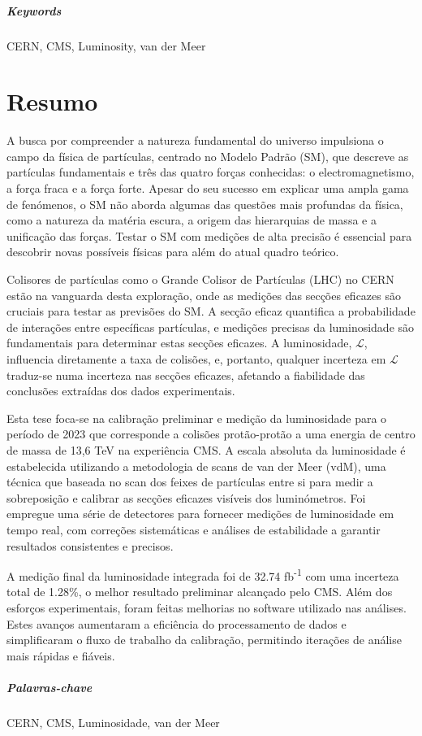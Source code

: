 \paragraph{Keywords} CERN, CMS, Luminosity, van der Meer

\cleardoublepage

\chapter*{Resumo}

A busca por compreender a natureza fundamental do universo impulsiona o campo da física de partículas, centrado no Modelo Padrão (SM), que descreve as partículas fundamentais e três das quatro forças conhecidas: o electromagnetismo, a força fraca e a força forte. Apesar do seu sucesso em explicar uma ampla gama de fenómenos, o SM não aborda algumas das questões mais profundas da física, como a natureza da matéria escura, a origem das hierarquias de massa e a unificação das forças. Testar o SM com medições de alta precisão é essencial para descobrir novas possíveis físicas para além do atual quadro teórico.

Colisores de partículas como o Grande Colisor de Partículas (LHC) no CERN estão na vanguarda desta exploração, onde as medições das secções eficazes são cruciais para testar as previsões do SM. A secção eficaz quantifica a probabilidade de interações entre específicas partículas, e medições precisas da luminosidade são fundamentais para determinar estas secções eficazes. A luminosidade, \(\mathcal{L}\), influencia diretamente a taxa de colisões, e, portanto, qualquer incerteza em \(\mathcal{L}\) traduz-se numa incerteza nas secções eficazes, afetando a fiabilidade das conclusões extraídas dos dados experimentais.

Esta tese foca-se na calibração preliminar e medição da luminosidade para o período de 2023 que corresponde a colisões protão-protão a uma energia de centro de massa de 13,6 TeV na experiência CMS. A escala absoluta da luminosidade é estabelecida utilizando a metodologia de scans de van der Meer (vdM), uma técnica que baseada no scan dos feixes de partículas entre si para medir a sobreposição e calibrar as secções eficazes visíveis dos luminómetros. Foi empregue uma série de detectores para fornecer medições de luminosidade em tempo real, com correções sistemáticas e análises de estabilidade a garantir resultados consistentes e precisos.

A medição final da luminosidade integrada foi de 32.74 fb\textsuperscript{-1} com uma incerteza total de 1.28\%, o melhor resultado preliminar alcançado pelo CMS. Além dos esforços experimentais, foram feitas melhorias no software utilizado nas análises. Estes avanços aumentaram a eficiência do processamento de dados e simplificaram o fluxo de trabalho da calibração, permitindo iterações de análise mais rápidas e fiáveis.

\paragraph{Palavras-chave} CERN, CMS, Luminosidade, van der Meer

\cleardoublepage
